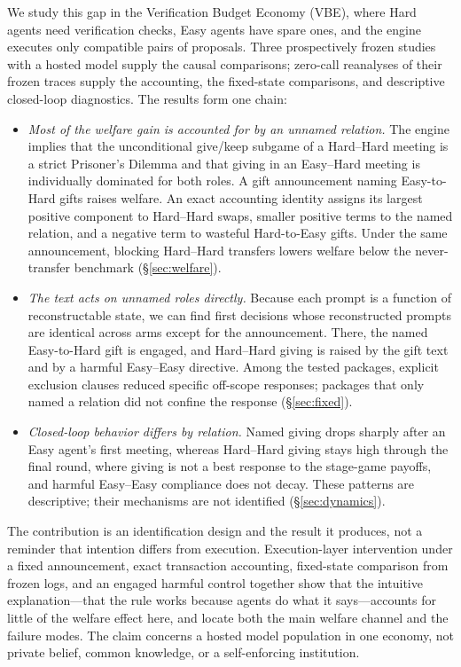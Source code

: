 \documentclass[sigconf,anonymous]{aamas}
\newcommand{\vbe}{VBE\xspace}
\begin{document}
We study this gap in the Verification Budget Economy (\vbe), where Hard agents
need verification checks, Easy agents have spare ones, and the engine executes
only compatible pairs of proposals.  Three prospectively frozen studies with a
hosted model supply the causal comparisons; zero-call reanalyses of their
frozen traces supply the accounting, the fixed-state comparisons, and
descriptive closed-loop diagnostics.  The results form one chain:

\begin{itemize}
\item \emph{Most of the welfare gain is accounted for by an unnamed relation.}
The engine implies that the unconditional give\slash keep subgame of a Hard--Hard
meeting is a strict Prisoner's Dilemma and that giving in an Easy--Hard meeting
is individually dominated for both roles.
A gift announcement naming Easy-to-Hard gifts raises welfare.  An exact
accounting identity assigns its largest positive component to Hard--Hard swaps,
smaller positive terms to the named relation, and a negative term to wasteful
Hard-to-Easy gifts.  Under the same announcement, blocking Hard--Hard transfers
lowers welfare below the never-transfer benchmark (\S\ref{sec:welfare}).
\item \emph{The text acts on unnamed roles directly.}  Because each prompt is a
function of reconstructable state, we can find first decisions whose
reconstructed prompts are identical across arms except for the announcement.  There, the
named Easy-to-Hard gift is engaged, and Hard--Hard giving is raised by the gift
text and by a harmful Easy--Easy directive.  Among the tested packages,
explicit exclusion clauses reduced specific off-scope responses; packages that
only named a relation did not confine the response (\S\ref{sec:fixed}).
\item \emph{Closed-loop behavior differs by relation.}  Named giving drops
sharply after an Easy agent's first meeting, whereas Hard--Hard giving stays
high through the final round, where giving is not a best response to the
stage-game payoffs, and harmful Easy--Easy compliance does not decay.  These
patterns are descriptive; their mechanisms are not identified
(\S\ref{sec:dynamics}).
\end{itemize}

The contribution is an identification design and the result it produces, not a
reminder that intention differs from execution.  Execution-layer intervention
under a fixed announcement, exact transaction accounting, fixed-state comparison
from frozen logs, and an engaged harmful control together show that the
intuitive explanation---that the rule works because agents do what it
says---accounts for little of the welfare effect here, and locate both the main
welfare channel and the failure modes.  The claim concerns a hosted model
population in one economy, not private belief, common knowledge, or a
self-enforcing institution.
\end{document}
